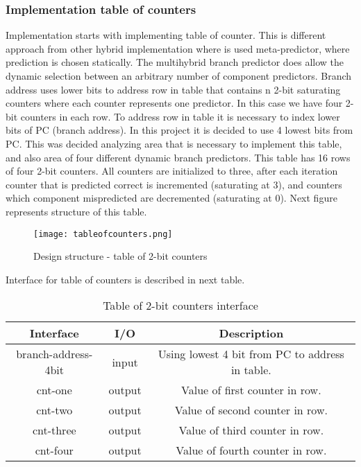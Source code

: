 \documentclass{scrreprt}
\begin{document}
\subsubsection*{Implementation table of counters}
Implementation starts with implementing table of counter. This is different approach from other hybrid implementation where is used meta-predictor, where prediction is chosen statically. The multihybrid branch predictor does allow the dynamic selection between an arbitrary number of component predictors. Branch address uses lower bits to address row in table that contains n 2-bit saturating counters where each counter represents one predictor. In this case we have four 2-bit counters in each row. 
To address row in table it is necessary to index lower bits of PC (branch address). In this project it is decided to use 4 lowest bits from PC. This was decided analyzing area that is necessary to implement this table, and also area of four different dynamic branch predictors. 
This table has 16 rows of four 2-bit counters. All counters are initialized to three, after each iteration counter that is predicted correct is incremented (saturating at 3), and counters which component mispredicted are decremented (saturating at 0). 
Next figure represents structure of this table. 
\begin{figure}[ht]
    \centering
    \texttt{[image: tableofcounters.png]}
    \caption{Design structure - table of 2-bit counters}
    \label{fig:c1}
\end{figure}
\newline
\newline
\newline
\newline
Interface for table of counters is described in next table.
    \begin{table}[htb!]
            \centering
            \begin{tabular}{|c|c|c|} \hline 
             Interface & I/O & Description \\ \hline  
             branch-address-4bit & input & Using lowest 4 bit from PC to address in table. \\ \hline  
             cnt-one & output & Value of first counter in row.  \\ \hline
             cnt-two & output & Value of second counter in row. \\ \hline
             cnt-three & output & Value of third counter in row. \\ \hline
             cnt-four & output & Value of fourth counter in row. \\ \hline
        \end{tabular}
        \caption{Table of 2-bit counters interface}
        \label{tab:Ct}
    \end{table}
\end{document}

